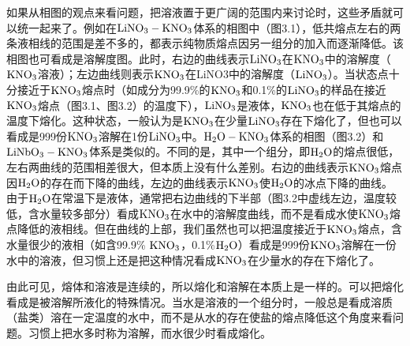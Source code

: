 如果从相图的观点来看问题，把溶液置于更广阔的范围内来讨论时，这些矛盾就可以统一起来了。例如在$\rm LiNO_3-KNO_3$体系的相图中（图3.1），低共熔点左右的两条液相线的范围是差不多的，都表示纯物质熔点因另一组分的加入而逐渐降低。该相图也可看成是溶解度图。此时，右边的曲线表示$\rm LiNO_3$在$\rm KNO_3$中的溶解度（$\rm KNO_3$溶液）；左边曲线则表示$\rm KNO_3$在LiNO3中的溶解度（$\rm LiNO_3$）。当状态点十分接近于$\rm KNO_3$熔点时（如成分为99.9\%的$\rm KNO_3$和0.1\%的$\rm LiNO_3$的样品在接近$\rm KNO_3$熔点（图3.1、图3.2）的温度下），$\rm LiNO_3$是液体，$\rm KNO_3$也在低于其熔点的温度下熔化。这种状态，一般认为是$\rm KNO_3$在少量$\rm LiNO_3$存在下熔化了，但也可以看成是999份$\rm KNO_3$溶解在1份$\rm LiNO_3$中。$\rm H_2O-KNO_3$体系的相图（图3.2）和$\rm LiNbO_3-KNO_3$体系是类似的。不同的是，其中一个组分，即$\rm H_2O$的熔点很低，左右两曲线的范围相差很大，但本质上没有什么差别。右边的曲线表示$\rm KNO_3$熔点因$\rm H_2O$的存在而下降的曲线，左边的曲线表示$\rm KNO_3$使$\rm H_2O$的冰点下降的曲线。由于$\rm H_2O$在常温下是液体，通常把右边曲线的下半部（图3.2中虚线左边，温度较低，含水量较多部分）看成$\rm KNO_3$在水中的溶解度曲线，而不是看成水使$\rm KNO_3$熔点降低的液相线。但在曲线的上部，我们虽然也可以把温度接近于$\rm KNO_3$熔点，含水量很少的液相（如含99.9\% $\rm KNO_3$，0.1\%$\rm H_2O$）看成是999份$\rm KNO_3$溶解在一份水中的溶液，但习惯上还是把这种情况看成$\rm KNO_3$在少量水的存在下熔化了。

由此可见，熔体和溶液是连续的，所以熔化和溶解在本质上是一样的。可以把熔化看成是被溶解所液化的特殊情况。当水是溶液的一个组分时，一般总是看成溶质（盐类）溶在一定温度的水中，而不是从水的存在使盐的熔点降低这个角度来看问题。习惯上把水多时称为溶解，而水很少时看成熔化。

